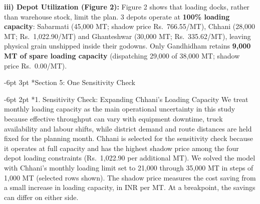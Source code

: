 \documentclass[10pt,a4paper]{article}
\makeatletter
\renewcommand\section{\@startsection {section}{1}{\z@}%
                                   {-6pt \@plus -2pt \@minus -2pt}%
                                   {3pt \@plus 1pt}%
                                   {\normalfont\Large\bfseries}}
\renewcommand\subsection{\@startsection{subsection}{2}{\z@}%
                                     {-6pt \@plus -2pt \@minus -1pt}%
                                     {2pt \@plus 1pt}%
                                     {\normalfont\large\bfseries}}
\makeatother
\begin{document}
\vspace{5pt}
\textbf{iii) Depot Utilization (Figure 2):} Figure 2 shows that loading docks, rather than warehouse stock, limit the plan. 3 depots operate at \textbf{100\% loading capacity}: Sabarmati (45,000 MT; shadow price Rs.~766.55/MT), Chhani (28,000 MT; Rs.~1,022.90/MT) and Ghanteshwar (30,000 MT; Rs.~335.62/MT), leaving physical grain unshipped inside their godowns. Only Gandhidham retains \textbf{9,000 MT of spare loading capacity} (dispatching 29,000 of 38,000 MT; shadow price Rs.~0.00/MT).

\newpage

\section*{Section 5: One Sensitivity Check}

\subsection*{1. Sensitivity Check: Expanding Chhani's Loading Capacity}
{\small We treat monthly loading capacity as the main operational uncertainty in this study because effective throughput can vary with equipment downtime, truck availability and labour shifts, while district demand and route distances are held fixed for the planning month. Chhani is selected for the sensitivity check because it operates at full capacity and has the highest shadow price among the four depot loading constraints (Rs.~1,022.90 per additional MT). We solved the model with Chhani's monthly loading limit set to 21,000 through 35,000 MT in steps of 1,000 MT (selected rows shown). The shadow price measures the cost saving from a small increase in loading capacity, in INR per MT. At a breakpoint, the savings can differ on either side.}
\end{document}
